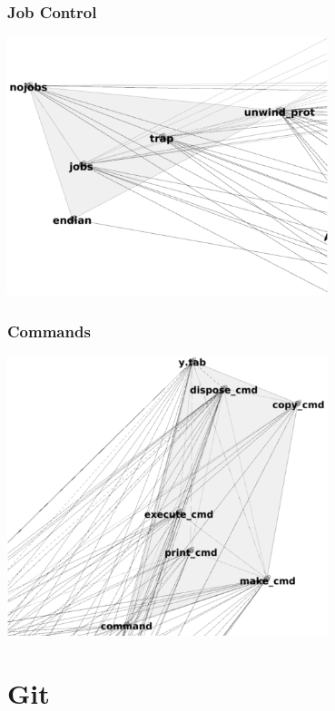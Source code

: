 \documentclass{../text-style}
\begin{document}
    \begin{frame}
        \frametitle{Job Control}
        \begin{center}
            \includegraphics[width=0.7\textwidth]{bashJobControl.png}
        \end{center}
    \end{frame}

    \begin{frame}
        \frametitle{Commands}
        \begin{center}
            \includegraphics[width=0.7\textwidth]{bashCommands.png}
        \end{center}
    \end{frame}

    \section{Git}
\end{document}
